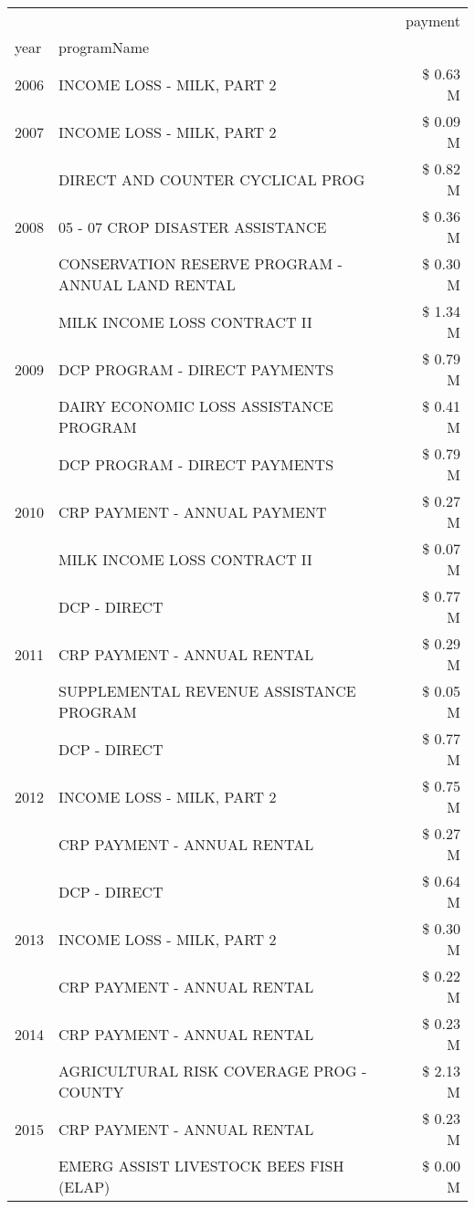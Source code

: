 \begin{tabular}{llr}
\toprule
 &  & payment \\
year & programName &  \\
\midrule
2006 & INCOME LOSS - MILK, PART 2 & \$ 0.63 M \\
\cline{1-3}
2007 & INCOME LOSS - MILK, PART 2 & \$ 0.09 M \\
\cline{1-3}
\multirow[t]{3}{*}{2008} & DIRECT AND COUNTER CYCLICAL PROG & \$ 0.82 M \\
 & 05 - 07 CROP DISASTER ASSISTANCE & \$ 0.36 M \\
 & CONSERVATION RESERVE PROGRAM - ANNUAL LAND RENTAL & \$ 0.30 M \\
\cline{1-3}
\multirow[t]{3}{*}{2009} & MILK INCOME LOSS CONTRACT II & \$ 1.34 M \\
 & DCP PROGRAM - DIRECT PAYMENTS & \$ 0.79 M \\
 & DAIRY ECONOMIC LOSS ASSISTANCE PROGRAM & \$ 0.41 M \\
\cline{1-3}
\multirow[t]{3}{*}{2010} & DCP PROGRAM - DIRECT PAYMENTS & \$ 0.79 M \\
 & CRP PAYMENT - ANNUAL PAYMENT & \$ 0.27 M \\
 & MILK INCOME LOSS CONTRACT II & \$ 0.07 M \\
\cline{1-3}
\multirow[t]{3}{*}{2011} & DCP - DIRECT & \$ 0.77 M \\
 & CRP PAYMENT - ANNUAL RENTAL & \$ 0.29 M \\
 & SUPPLEMENTAL REVENUE ASSISTANCE PROGRAM & \$ 0.05 M \\
\cline{1-3}
\multirow[t]{3}{*}{2012} & DCP - DIRECT & \$ 0.77 M \\
 & INCOME LOSS - MILK, PART 2 & \$ 0.75 M \\
 & CRP PAYMENT - ANNUAL RENTAL & \$ 0.27 M \\
\cline{1-3}
\multirow[t]{3}{*}{2013} & DCP - DIRECT & \$ 0.64 M \\
 & INCOME LOSS - MILK, PART 2 & \$ 0.30 M \\
 & CRP PAYMENT - ANNUAL RENTAL & \$ 0.22 M \\
\cline{1-3}
2014 & CRP PAYMENT - ANNUAL RENTAL & \$ 0.23 M \\
\cline{1-3}
\multirow[t]{3}{*}{2015} & AGRICULTURAL RISK COVERAGE PROG - COUNTY & \$ 2.13 M \\
 & CRP PAYMENT - ANNUAL RENTAL & \$ 0.23 M \\
 & EMERG ASSIST LIVESTOCK BEES FISH (ELAP) & \$ 0.00 M \\
\cline{1-3}

\end{tabular}
